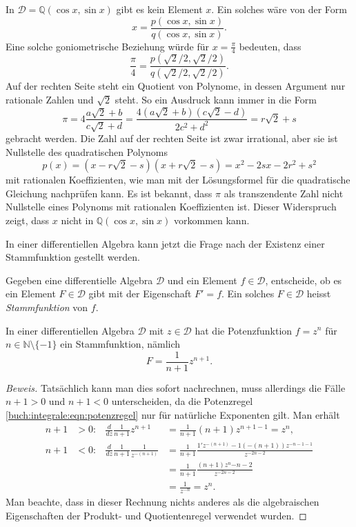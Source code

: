 \begin{beispiel}
In $\mathscr{D}=\mathbb{Q}(\cos x,\sin x)$ gibt es kein Element $x$.
Ein solches wäre von der Form
\[
x = \frac{p(\cos x,\sin x)}{q(\cos x,\sin x)}.
\]
Eine solche goniometrische Beziehung würde für $x=\frac{\pi}4$ bedeuten,
dass
\[
\frac{\pi}4
=
\frac{p(\sqrt{2}/2,\sqrt{2}/2)}{q(\sqrt{2}/2,\sqrt{2}/2)}.
\]
Auf der rechten Seite steht ein Quotient von Polynome, in dessen
Argument nur rationale Zahlen und $\sqrt{2}$ steht.
So ein Ausdruck kann immer in die Form
\[
\pi
=
4\frac{a\sqrt{2}+b}{c\sqrt{2}+d}
=
\frac{4(a\sqrt{2}+b)(c\sqrt{2}-d)}{2c^2+d^2}
=
r\sqrt{2}+s
\]
gebracht werden.
Die Zahl auf der rechten Seite ist zwar irrational, aber sie ist Nullstelle
des quadratischen Polynoms
\[
p(x)
=
(x-r\sqrt{2}-s)(x+r\sqrt{2}-s)
=
x^2
-2sx
-2r^2+s^2
\]
mit rationalen Koeffizienten, wie man mit der Lösungsformel für die
quadratische Gleichung nachprüfen kann.
Es ist bekannt, dass $\pi$ als transzendente Zahl nicht Nullstelle
eines Polynoms mit rationalen Koeffizienten ist.
Dieser Widerspruch zeigt, dass $x$ nicht in $\mathbb{Q}(\cos x, \sin x)$
vorkommen kann.
\end{beispiel}

In einer differentiellen Algebra kann jetzt die Frage nach der
Existenz einer Stammfunktion gestellt werden.

\begin{aufgabe}
Gegeben eine differentielle Algebra $\mathscr{D}$ und ein Element
$f\in\mathscr{D}$, entscheide, ob es ein Element $F\in\mathscr{D}$ 
gibt mit der Eigenschaft $F'=f$.
Ein solches $F\in\mathscr{D}$ heisst {\em Stammfunktion} von $f$.
\end{aufgabe}

\begin{satz}
In einer differentiellen Algebra $\mathscr{D}$ mit $z\in\mathscr{D}$
hat die Potenzfunktion $f=z^n$ für $n\in\mathbb{N}\setminus\{-1\}$
ein Stammfunktion, nämlich 
\[
F = \frac{1}{n+1} z^{n+1}.
\]
\label{buch:integrale:satz:potenzstammfunktion}
\end{satz}

\begin{proof}[Beweis]
Tatsächlich kann man dies sofort nachrechnen, muss allerdings die
Fälle $n+1 >0$ und $n+1<0$ unterscheiden, da die Potenzregel
\eqref{buch:integrale:eqn:potenzregel} nur für natürliche Exponenten
gilt.
Man erhält
\begin{align*}
n+1&>0\colon
&
\frac{d}{dz}\frac{1}{n+1}z^{n+1}
&=
\frac{1}{n+1}(n+1)z^{n+1-1}
=
z^n,
\\
n+1&<0\colon
&
\frac{d}{dz}\frac{1}{n+1}\frac{1}{z^{-(n+1)}}
&=
\frac{1}{n+1}\frac{1'z^{-(n+1)}-1(-(n+1))z^{-n-1-1}}{z^{-2n-2}}
\\
&&
&=
\frac{1}{n+1}
\frac{(n+1)z^n{-n-2}}{z^{-2n-2}}
\\
&&
&=
\frac{1}{z^{-n}}=z^n.
\end{align*}
Man beachte, dass in dieser Rechnung nichts anderes als die
algebraischen Eigenschaften der Produkt- und Quotientenregel
verwendet wurden.
\end{proof}


